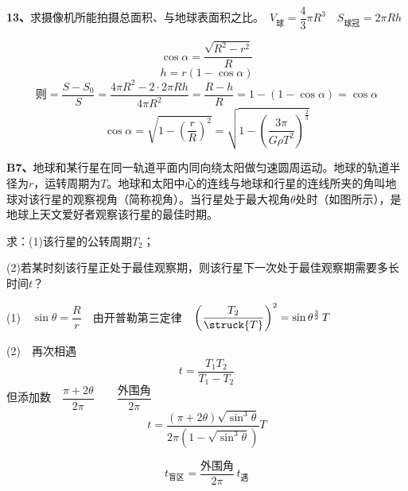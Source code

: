 \begin{problem}[13]
\textbf{13、}求摄像机所能拍摄总面积、与地球表面积之比。　$V_{\text{球}}=\dfrac{4}{3}\pi R^3$　$S_{\text{球冠}}=2\pi Rh$
\begin{solution}
\[ \cos\alpha=\dfrac{\sqrt{R^2-r^2}}{R} \]
\[ h=r(1-\cos\alpha) \]
\[ \text{则}=\dfrac{S-S_0}{S}=\dfrac{4\pi R^2-2\cdot2\pi Rh}{4\pi R^2}=\dfrac{R-h}{R}=1-(1-\cos\alpha)=\cos\alpha \]
\[ \cos\alpha=\sqrt{1-\left(\dfrac{r}{R}\right)^2}=\sqrt{1-\left(\dfrac{3\pi}{G\rho T^2}\right)^{\frac{2}{3}}} \]
\end{solution}
\end{problem}
\begin{problem}[B7]
\textbf{B7、}地球和某行星在同一轨道平面内同向绕太阳做匀速圆周运动。地球的轨道半径为$r$，运转周期为$T$。地球和太阳中心的连线与地球和行星的连线所夹的角叫地球对该行星的观察视角（简称视角）。当行星处于最大视角$\theta$处时（如图所示），是地球上天文爱好者观察该行星的最佳时期。

求：(1)该行星的公转周期$T_2$；

(2)若某时刻该行星正处于最佳观察期，则该行星下一次处于最佳观察期需要多长时间$t$？
\begin{solution}
(1)　$\sin\theta=\dfrac{R}{r}$　由开普勒第三定律　$\left(\dfrac{T_2}{\struck{T}}\right)^{2}=\sin\theta^{\frac{3}{2}}\,T$ %
\medskip

(2)　再次相遇
\[ t=\dfrac{T_1T_2}{T_1-T_2} \]
但添加数　$\dfrac{\pi+2\theta}{2\pi}$　　$\dfrac{\text{外围角}}{2\pi}$
\[ t=\dfrac{(\pi+2\theta)\sqrt{\sin^3\theta}}{2\pi\left(1-\sqrt{\sin^3\theta}\right)}T \]
\end{solution}
\end{problem}
\[ t_{\text{盲区}}=\dfrac{\text{外围角}}{2\pi}\,t_{\text{遇}} \]
